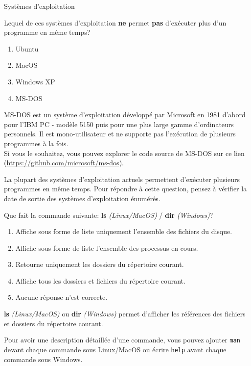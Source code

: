 \begin{section}{Systèmes d'exploitation}
\begin{Exercice}[2 minutes]
    Lequel de ces systèmes d'exploitation \textbf{ne} permet \textbf{pas} d'exécuter plus d'un programme en même temps?
    \begin{enumerate}
        \item Ubuntu
        \item MacOS
        \item Windows XP
        \item MS-DOS
    \end{enumerate}
    \begin{solution}
        MS-DOS est un système d'exploitation développé par Microsoft en 1981 d'abord pour l'IBM PC - modèle 5150 puis pour une plus large gamme d'ordinateurs personnels. Il est mono-utilisateur et ne supporte pas l'exécution de plusieurs programmes à la fois.
        \\
        Si vous le souhaitez, vous pouvez explorer le code source de MS-DOS sur ce lien (\url{https://github.com/microsoft/ms-dos}). 
    \end{solution}
    \begin{conseil}
        La plupart des systèmes d'exploitation actuels permettent d'exécuter plusieurs programmes en même temps. Pour répondre à cette question, pensez à vérifier la date de sortie des systèmes d'exploitation énumérés.
    \end{conseil}
\end{Exercice}

\begin{Exercice}[3 minutes]
        Que fait la commande suivante: \textbf{ls} \textit{(Linux/MacOS)} / \textbf{dir} \textit{(Windows)}?
        \begin{enumerate}
            \item Affiche sous forme de liste uniquement l'ensemble des fichiers du disque.
            \item Affiche sous forme de liste l'ensemble des processus en cours.
            \item Retourne uniquement les dossiers du répertoire courant.
            \item Affiche tous les dossiers et fichiers du répertoire courant.
            \item Aucune réponse n'est correcte.
        \end{enumerate}
        \begin{solution}
            \textbf{ls} \textit{(Linux/MacOS)} ou \textbf{dir} \textit{(Windows)} permet d'afficher les références des fichiers et dossiers du répertoire courant.
        \end{solution}
        \begin{conseil}
            Pour avoir une description détaillée d'une commande, vous pouvez ajouter \lstinline{man} devant chaque commande sous Linux/MacOS ou écrire \texttt{help} avant chaque commande sous Windows.
        \end{conseil}
    \end{Exercice}


\end{section}
